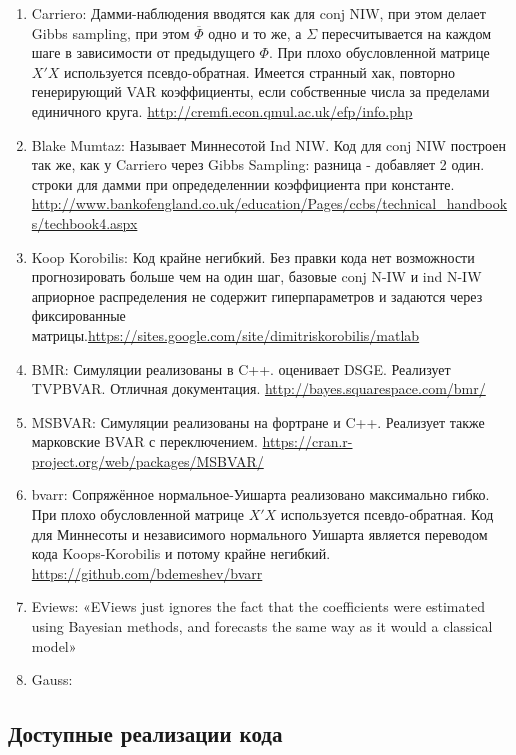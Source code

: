 \documentclass[11pt]{article} %
\newcommand{\post}{\overline}
\begin{document}
\begin{enumerate}
\item Carriero: Дамми-наблюдения вводятся как для conj NIW, при этом делает Gibbs sampling, при этом $\post\Phi$ одно и то же, а $\Sigma$ пересчитывается на каждом шаге в зависимости от предыдущего $\Phi$. При плохо обусловленной матрице $X'X$ используется псевдо-обратная. Имеется странный хак, повторно генерирующий VAR коэффициенты, если собственные числа за пределами единичного круга. \url{http://cremfi.econ.qmul.ac.uk/efp/info.php} 
\item Blake Mumtaz: Называет Миннесотой Ind NIW.  Код для conj NIW построен так же, как у Carriero через Gibbs Sampling: разница - добавляет 2 один. строки для дамми при опредеделеннии коэффициента при константе. \url{http://www.bankofengland.co.uk/education/Pages/ccbs/technical_handbooks/techbook4.aspx}
\item Koop Korobilis: Код крайне негибкий. Без правки кода нет возможности прогнозировать больше чем на один шаг, базовые conj N-IW и ind N-IW априорное распределения не содержит  гиперпараметров и задаются через фиксированные матрицы.\url{https://sites.google.com/site/dimitriskorobilis/matlab}\\
\item BMR: Симуляции реализованы в C++.  оценивает DSGE.  Реализует TVPBVAR. Отличная документация. \url{ http://bayes.squarespace.com/bmr/} 
\item MSBVAR: Симуляции реализованы на фортране и C++. Реализует также марковские BVAR с переключением.  \url{https://cran.r-project.org/web/packages/MSBVAR/ }
\item bvarr: Сопряжённое нормальное-Уишарта реализовано максимально гибко.  При плохо обусловленной матрице $X'X$ используется псевдо-обратная. Код для Миннесоты и независимого нормального Уишарта является переводом кода Koops-Korobilis и потому крайне негибкий. \url{https://github.com/bdemeshev/bvarr }
\item Eviews: «EViews just ignores the fact that the coefficients were estimated using Bayesian methods, and forecasts the same way as it would a classical model» 
\item Gauss: 
\end{enumerate}
\newpage


\newpage
\subsection*{Доступные реализации кода}
\end{document}
